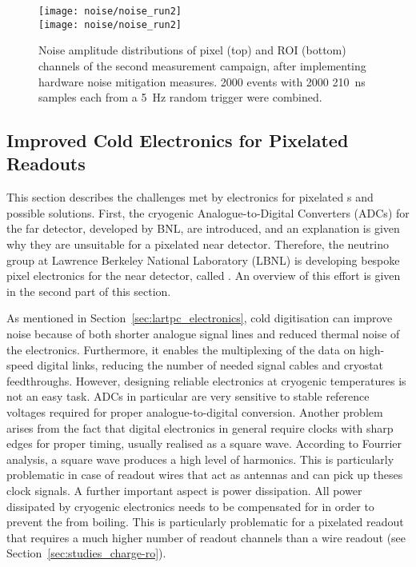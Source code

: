 \begin{figure}[htb]
	\centering
	\texttt{[image: noise/noise\_run2]} \\
	\texttt{[image: noise/noise\_run2]}
	\caption{Noise amplitude distributions of pixel (top) and ROI (bottom) channels of the second measurement campaign, after implementing hardware noise mitigation measures.
	\num{2000} events with \num{2000} \SI{210}{\nano\second} samples each from a \SI{5}{\hertz} random trigger were combined.}
	\label{fig:electronics_noise-run2}
\end{figure}

\afterpage{\clearpage}


\subsection*{Improved Cold Electronics for Pixelated Readouts}

This section describes the challenges met by electronics for pixelated \lartpc{}s and possible solutions.
First, the cryogenic Analogue-to-Digital Converters (ADCs) for the \dune{} far detector, developed by BNL, are introduced, and an explanation is given why they are unsuitable for a pixelated near detector.
Therefore, the neutrino group at Lawrence Berkeley National Laboratory (LBNL) is developing bespoke pixel electronics for the near detector, called \larpix{}.
An overview of this effort is given in the second part of this section.

As mentioned in Section~\ref{sec:lartpc_electronics}, cold digitisation can improve noise because of both shorter analogue signal lines and reduced thermal noise of the electronics.
Furthermore, it enables the multiplexing of the data on high-speed digital links, reducing the number of needed signal cables and cryostat feedthroughs.
However, designing reliable electronics at cryogenic temperatures is not an easy task.
ADCs in particular are very sensitive to stable reference voltages required for proper analogue-to-digital conversion.
Another problem arises from the fact that digital electronics in general require clocks with sharp edges for proper timing, usually realised as a square wave.
According to Fourrier analysis, a square wave produces a high level of harmonics.
This is particularly problematic in case of readout wires that act as antennas and can pick up theses clock signals.
A further important aspect is power dissipation.
All power dissipated by cryogenic electronics needs to be compensated for in order to prevent the \lar{} from boiling.
This is particularly problematic for a pixelated readout that requires a much higher number of readout channels than a wire readout (see Section~\ref{sec:studies_charge-ro}).

